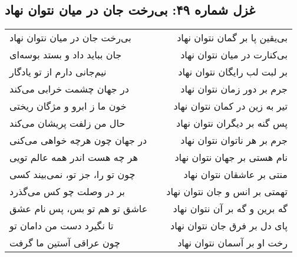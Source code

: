 \begin{center}
\section*{غزل شماره ۴۹: بی‌رخت جان در میان نتوان نهاد}
\label{sec:049}
\begin{longtable}{l p{0.5cm} r}
بی‌رخت جان در میان نتوان نهاد
&&
بی‌یقین پا بر گمان نتوان نهاد
\\
جان بباید داد و بستد بوسه‌ای
&&
بی‌کنارت در میان نتوان نهاد
\\
نیم‌جانی دارم از تو یادگار
&&
بر لبت لب رایگان نتوان نهاد
\\
در جهان چشمت خرابی می‌کند
&&
جرم بر دور زمان نتوان نهاد
\\
خون ما ز ابرو و مژگان ریختی
&&
تیر به زین در کمان نتوان نهاد
\\
حال من زلفت پریشان می‌کند
&&
پس گنه بر دیگران نتوان نهاد
\\
در جهان چون هرچه خواهی می‌کنی
&&
جرم بر هر ناتوان نتوان نهاد
\\
هر چه هست اندر همه عالم تویی
&&
نام هستی بر جهان نتوان نهاد
\\
چون تو را، جز تو، نمی‌بیند کسی
&&
منتی بر عاشقان نتوان نهاد
\\
بر در وصلت چو کس می‌گذرد
&&
تهمتی بر انس و جان نتوان نهاد
\\
عاشق تو هم تو بس، پس نام عشق
&&
گه برین و گه بر آن نتوان نهاد
\\
تا نگیرد دست من دامان تو
&&
پای دل بر فرق جان نتوان نهاد
\\
چون عراقی آستین ما گرفت
&&
رخت او بر آسمان نتوان نهاد
\\
\end{longtable}
\end{center}
